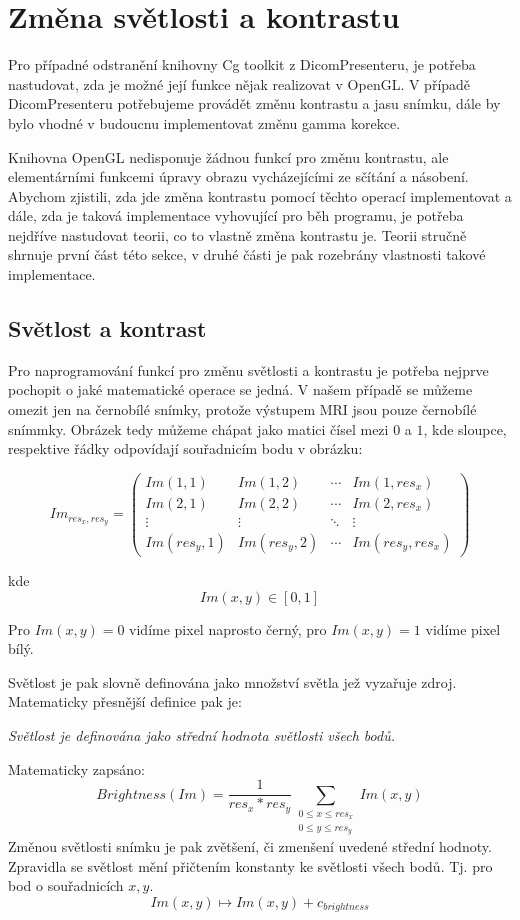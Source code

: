 \section{Změna světlosti a kontrastu}
Pro případné odstranění knihovny Cg toolkit z DicomPresenteru, je potřeba nastudovat, zda je možné její funkce nějak realizovat v OpenGL. V případě DicomPresenteru potřebujeme provádět změnu kontrastu a jasu snímku, dále by bylo vhodné v budoucnu implementovat změnu gamma korekce.

Knihovna OpenGL nedisponuje žádnou funkcí pro změnu kontrastu, ale elementárními funkcemi úpravy obrazu vycházejícími ze sčítání a násobení. Abychom zjistili, zda jde změna kontrastu pomocí těchto operací implementovat a dále, zda je taková implementace vyhovující pro běh programu, je potřeba nejdříve nastudovat teorii, co to vlastně změna kontrastu je. Teorii stručně shrnuje první část této sekce, v druhé části je pak rozebrány vlastnosti takové implementace.

\subsection{Světlost a kontrast}
Pro naprogramování funkcí pro změnu světlosti a kontrastu je potřeba nejprve pochopit o jaké matematické operace se jedná. V našem případě se můžeme omezit jen na černobílé snímky, protože výstupem MRI jsou pouze černobílé snímmky. Obrázek tedy můžeme chápat jako matici čísel mezi $0$ a $1$, kde sloupce, respektive řádky odpovídají souřadnicím bodu v obrázku:

\[
 Im_{res_{x},res_{y}} =
 \begin{pmatrix}
  Im(1,1) & Im(1,2) & \cdots & Im(1,res_{x}) \\
  Im(2,1) & Im(2,2) & \cdots & Im(2,res_{x}) \\
  \vdots  & \vdots  & \ddots & \vdots  \\
  Im(res_{y},1) & Im(res_{y},2) & \cdots & Im(res_{y},res_{x})
 \end{pmatrix}
\]

kde \[ Im(x,y) \in [0,1] \]

Pro $ Im(x,y) = 0 $ vidíme pixel naprosto černý, pro $ Im(x,y) = 1 $ vidíme pixel bílý.

Světlost je pak slovně definována jako množství světla jež vyzařuje zdroj. Matematicky přesnější definice pak je:

\emph{Světlost je definována jako střední hodnota světlosti všech bodů.}

Matematicky zapsáno:
\[
  Brightness(Im) = \frac{1}{res_{x}*res_{y}}\sum_{\substack{0 \leq x \leq res_{x} \\ 0 \leq y \leq res_{y}}} Im(x,y)
\]
Změnou světlosti snímku je pak zvětšení, či zmenšení uvedené střední hodnoty. Zpravidla se světlost mění přičtením konstanty ke světlosti všech bodů. Tj. pro bod o souřadnicích $x,y$.
\[
Im(x,y) \longmapsto Im(x,y) + c_{brightness}
\]

